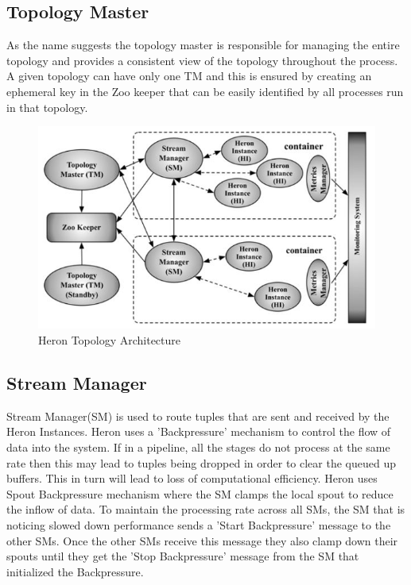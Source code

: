 \documentclass[9pt,twocolumn,twoside]{styles/osajnl}
\begin{document}
\subsection{Topology Master}
As the name suggests the topology master is responsible for managing the entire topology and provides a consistent view of the topology throughout the process. A given topology can have only one TM and this is ensured by creating an ephemeral key in the Zoo keeper that can be easily identified by all processes run in that topology. 
\begin{figure}[htbp]
\begin{center}
\centering
\includegraphics[width=\linewidth]{images/img2}
\caption{Heron Topology Architecture}
\label{fig:false-color}
\end{center}
\end{figure}
\subsection{Stream Manager}
Stream Manager(SM) is used to route tuples that are sent and received by the Heron Instances. Heron uses a 'Backpressure' mechanism to control the flow of data into the system. If in a pipeline, all the stages do not process at the same rate then this may lead to tuples being dropped in order to clear the queued up buffers. This in turn will lead to loss of computational efficiency. Heron uses Spout Backpressure mechanism where the SM clamps the local spout to reduce the inflow of data. To maintain the processing rate across all SMs, the SM that is noticing slowed down performance sends a 'Start Backpressure' message to the other SMs. Once the other SMs receive this message they also clamp down their spouts until they get the 'Stop Backpressure' message from the SM that initialized the Backpressure.\cite{TwitterHeron3}
\end{document}
